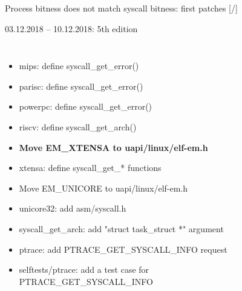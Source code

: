 \documentclass[unicode,aspectratio=169]{beamer}
\begin{document}
\begin{frame}{Process bitness does not match syscall bitness: first patches \hfill [\insertframenumber/\inserttotalframenumber]}
\begin{block}{03.12.2018 -- 10.12.2018: 5th edition}
\begin{itemize}
\begin{columns}
\begin{itemize}
				\item mips: define syscall\_get\_error()
				\item parisc: define syscall\_get\_error()
				\item powerpc: define syscall\_get\_error()
				\item riscv: define syscall\_get\_arch()
				\item {\bf Move EM\_XTENSA to uapi/linux/elf-em.h}
				\item xtensa: define syscall\_get\_* functions
				\item Move EM\_UNICORE to uapi/linux/elf-em.h
				\item unicore32: add asm/syscall.h
				\item syscall\_get\_arch: add "struct task\_struct *" argument
				\item ptrace: add PTRACE\_GET\_SYSCALL\_INFO request
				\item selftests/ptrace: add a test case for \\ PTRACE\_GET\_SYSCALL\_INFO
			\end{itemize}
	\end{columns}
\end{itemize}
\end{block}
\end{frame}
\end{document}
